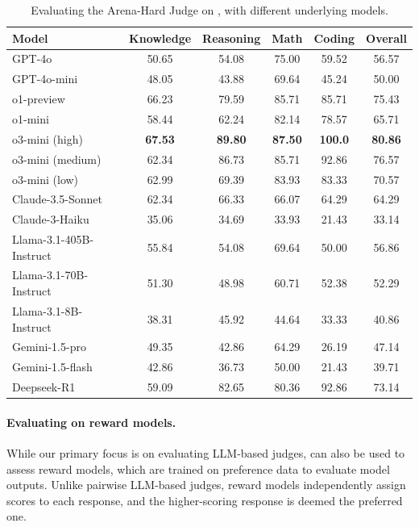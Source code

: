 \documentclass{article} %
\begin{document}
\begin{table}[h]
\centering
\begin{tabular}{lccccc}
\toprule
Model & Knowledge & Reasoning & Math & Coding & Overall \\ \midrule
GPT-4o & 50.65 &  54.08 & 75.00 &  59.52 &  56.57  \\
GPT-4o-mini & 48.05 & 43.88 &  69.64 & 45.24 & 50.00 \\
o1-preview & 66.23 & 79.59 & 85.71 & 85.71 & 75.43 \\
o1-mini & 58.44 &  62.24 & 82.14 &  78.57 & 65.71  \\
o3-mini (high) & \textbf{67.53} & \textbf{89.80} & \textbf{87.50} & \textbf{100.0} & \textbf{80.86} \\
o3-mini (medium) & 62.34 & 86.73 & 85.71 & 92.86 & 76.57 \\
o3-mini (low) & 62.99 & 69.39 & 83.93 & 83.33 & 70.57 \\ \midrule
Claude-3.5-Sonnet & 62.34 &  66.33 & 66.07 &  64.29 &  64.29 \\
Claude-3-Haiku & 35.06 &  34.69 & 33.93 & 21.43 &  33.14 \\ \midrule
Llama-3.1-405B-Instruct & 55.84 & 54.08 & 69.64 & 50.00 & 56.86 \\
Llama-3.1-70B-Instruct & 51.30 &  48.98 &  60.71 & 52.38 & 52.29  \\
Llama-3.1-8B-Instruct & 38.31 &  45.92 &  44.64 &  33.33 & 40.86 \\ \midrule
Gemini-1.5-pro & 49.35 & 42.86 &  64.29 &  26.19 & 47.14\\
Gemini-1.5-flash & 42.86 &  36.73 &  50.00 &  21.43 & 39.71 \\ \midrule
Deepseek-R1 & 59.09 & 82.65 & 80.36 & 92.86 & 73.14 \\
\bottomrule
\end{tabular}
\caption{Evaluating the Arena-Hard Judge on \sys, with different underlying models.}
\label{table:multi-model}
\end{table}

\paragraph{Evaluating \sys on reward models.}

While our primary focus is on evaluating LLM-based judges, \sys can also be used to assess reward models, which are trained on preference data to evaluate model outputs. Unlike pairwise LLM-based judges, reward models independently assign scores to each response, and the higher-scoring response is deemed the preferred one.
\end{document}
